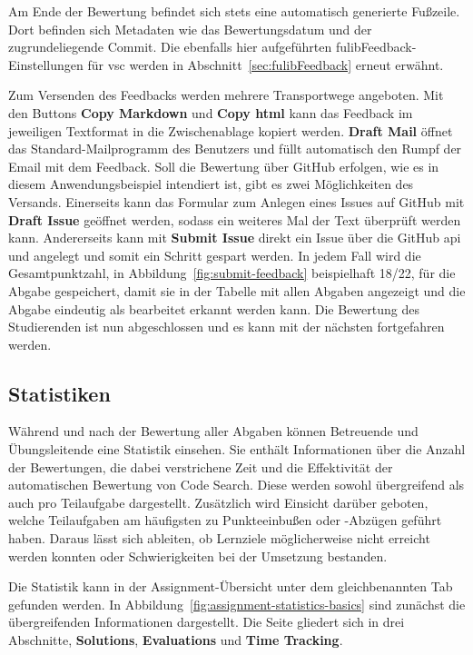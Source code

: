 Am Ende der Bewertung befindet sich stets eine automatisch generierte Fußzeile.
Dort befinden sich Metadaten wie das Bewertungsdatum und der zugrundeliegende Commit.
Die ebenfalls hier aufgeführten fulibFeedback-Einstellungen für \ac{vsc} werden in Abschnitt~\ref{sec:fulibFeedback} erneut erwähnt.

Zum Versenden des Feedbacks werden mehrere Transportwege angeboten.
Mit den Buttons \textbf{Copy Markdown} und \textbf{Copy \acs{html}} kann das Feedback im jeweiligen Textformat in die Zwischenablage kopiert werden.
\textbf{Draft Mail} öffnet das Standard-Mailprogramm des Benutzers und füllt automatisch den Rumpf der Email mit dem Feedback.
Soll die Bewertung über GitHub erfolgen, wie es in diesem Anwendungsbeispiel intendiert ist, gibt es zwei Möglichkeiten des Versands.
Einerseits kann das Formular zum Anlegen eines Issues auf GitHub mit \textbf{Draft Issue} geöffnet werden, sodass ein weiteres Mal der Text überprüft werden kann.
Andererseits kann mit \textbf{Submit Issue} direkt ein Issue über die GitHub \ac{api} und angelegt und somit ein Schritt gespart werden.
In jedem Fall wird die Gesamtpunktzahl, in Abbildung~\ref{fig:submit-feedback} beispielhaft 18/22, für die Abgabe gespeichert, damit sie in der Tabelle mit allen Abgaben angezeigt und die Abgabe eindeutig als bearbeitet erkannt werden kann.
Die Bewertung des Studierenden ist nun abgeschlossen und es kann mit der nächsten fortgefahren werden.

\subsection{Statistiken}\label{subsec:statistics}

Während und nach der Bewertung aller Abgaben können Betreuende und Übungsleitende eine Statistik einsehen.
Sie enthält Informationen über die Anzahl der Bewertungen, die dabei verstrichene Zeit und die Effektivität der automatischen Bewertung von Code Search.
Diese werden sowohl übergreifend als auch pro Teilaufgabe dargestellt.
Zusätzlich wird Einsicht darüber geboten, welche Teilaufgaben am häufigsten zu Punkteeinbußen oder -Abzügen geführt haben.
Daraus lässt sich ableiten, ob Lernziele möglicherweise nicht erreicht werden konnten oder Schwierigkeiten bei der Umsetzung bestanden.

Die Statistik kann in der Assignment-Übersicht unter dem gleichbenannten Tab gefunden werden.
In Abbildung~\ref{fig:assignment-statistics-basics} sind zunächst die übergreifenden Informationen dargestellt.
Die Seite gliedert sich in drei Abschnitte, \textbf{Solutions}, \textbf{Evaluations} und \textbf{Time Tracking}.

